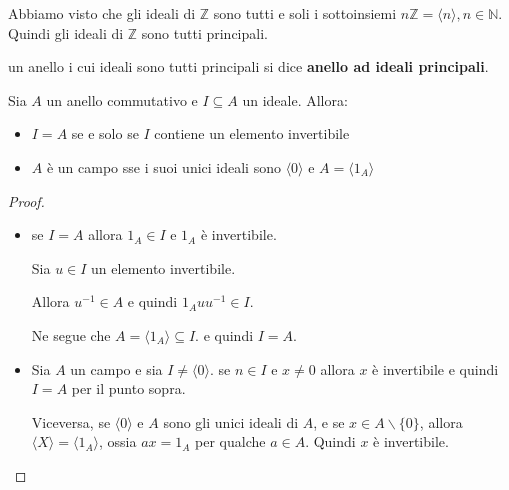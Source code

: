 \documentclass[../main.tex]{subfiles}
\begin{document}
\begin{example}
    Abbiamo visto che gli ideali di $\mathbb{Z} $ sono tutti e soli i sottoinsiemi $n \mathbb{Z}  = \langle n \rangle, n \in \mathbb{N} $.
    Quindi gli ideali di $\mathbb{Z} $ sono tutti principali.
\end{example}

\begin{definition}
    un anello i cui ideali sono tutti principali si dice \textbf{anello ad ideali principali}.
\end{definition}

\begin{proposition}
    Sia $A$ un anello commutativo e $I \subseteq A$ un ideale. Allora:
    \begin{itemize}
        \item $I = A$ se e solo se $I$ contiene un elemento invertibile
        \item $A$ è un campo sse i suoi unici ideali sono $\langle 0 \rangle$ e $A = \langle 1_A \rangle$
    \end{itemize}
\end{proposition}

\begin{proof}
    \
    \begin{itemize}
        \item se $I = A$ allora $1_A \in I$ e $1_A$ è invertibile.

              Sia $u \in I$ un elemento invertibile.

              Allora $u^{-1} \in A$ e quindi $1_A u u^{-1} \in I$.

              Ne segue che $A = \langle 1_A \rangle \subseteq I$. e quindi $I = A$.
        \item Sia $A$ un campo e sia $I \neq \langle 0 \rangle$. se $ n \in I$ e $x \neq 0$ allora $x$ è invertibile e quindi $I = A$
              per il punto sopra.

              Viceversa, se $\langle 0 \rangle$ e $A$ sono gli unici ideali di $A$,
              e se $x \in A  \backslash \{0\}$, allora $\langle X \rangle = \langle 1_A \rangle$, ossia $ax = 1_A$ per qualche $a \in A$. Quindi $x$ è invertibile.
    \end{itemize}
\end{proof}
\end{document}
